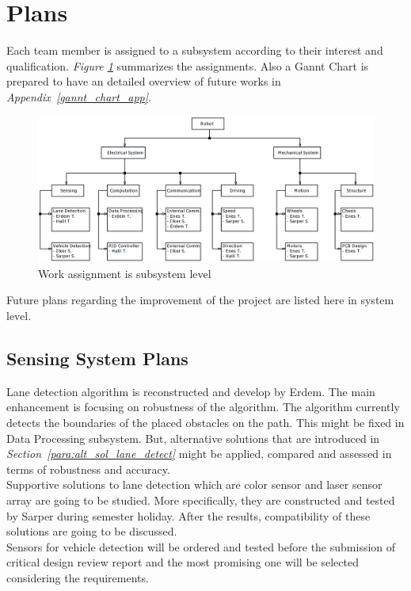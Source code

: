 \documentclass[a4paper,12pt]{article}
\begin{document}
	\section{Plans}
	Each team member is assigned to a subsystem according to their interest and qualification. \textit{Figure \ref{fig:plan-org}} summarizes the assignments. Also a Gannt Chart is prepared to have an detailed overview of future works in \textit{Appendix~\ref{gannt_chart_app}}.
	\begin{figure}[h]
		\includegraphics[width=\textwidth,center]{images/plan-organization}
		\caption{Work assignment is subsystem level}\label{fig:plan-org}
	\end{figure}
	Future plans regarding the improvement of the project are listed here in system level.
	\subsection{Sensing System Plans}
	Lane detection algorithm is reconstructed and develop by Erdem. The main enhancement is focusing on robustness of the algorithm. The algorithm currently detects the boundaries of the placed obstacles on the path. This might be fixed in Data Processing subsystem. But, alternative solutions that are introduced in \textit{Section~\ref{para:alt_sol_lane_detect}} might be applied, compared and assessed in terms of robustness and accuracy.\\
	   
	Supportive solutions to lane detection which are color sensor and laser sensor array are going to be studied. More specifically, they are constructed and tested by Sarper during semester holiday. After the results, compatibility of these solutions are going to be discussed.\\
	
	Sensors for vehicle detection will be ordered and tested before the submission of critical design review report and the most promising one will be selected considering the requirements.
	
\end{document}

